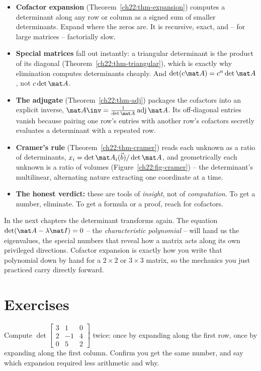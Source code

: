\begin{itemize}
\item \textbf{Cofactor expansion} (Theorem~\ref{ch22:thm-expansion}) computes a determinant along any
  row or column as a signed sum of smaller determinants. Expand where the zeros are. It is recursive,
  exact, and -- for large matrices -- factorially slow.
\item \textbf{Special matrices} fall out instantly: a triangular determinant is the product of its
  diagonal (Theorem~\ref{ch22:thm-triangular}), which is exactly why elimination computes determinants
  cheaply. And $\det(c\mat A)=c^n\det\mat A$, not $c\det\mat A$.
\item \textbf{The adjugate} (Theorem~\ref{ch22:thm-adj}) packages the cofactors into an explicit
  inverse, $\mat A\inv=\frac{1}{\det\mat A}\operatorname{adj}\mat A$. Its off-diagonal entries vanish
  because pairing one row's entries with another row's cofactors secretly evaluates a determinant with
  a repeated row.
\item \textbf{Cramer's rule} (Theorem~\ref{ch22:thm-cramer}) reads each unknown as a ratio of
  determinants, $x_i=\det\mat A_i(\vec b)/\det\mat A$, and geometrically each unknown is a ratio of
  volumes (Figure~\ref{ch22:fig-cramer}) -- the determinant's multilinear, alternating nature
  extracting one coordinate at a time.
\item \textbf{The honest verdict:} these are tools of \emph{insight}, not of \emph{computation}. To
  get a number, eliminate. To get a formula or a proof, reach for cofactors.
\end{itemize}

In the next chapters the determinant transforms again. The equation $\det(\mat A-\lambda\mat I)=0$ --
the \emph{characteristic polynomial} -- will hand us the eigenvalues, the special numbers that reveal
how a matrix acts along its own privileged directions. Cofactor expansion is exactly how you write
that polynomial down by hand for a $2\times2$ or $3\times3$ matrix, so the mechanics you just practiced
carry directly forward.

\section{Exercises}

\begin{exercise}\label{ch22:ex-warmup-expand}
Compute $\det\begin{bmatrix} 3 & 1 & 0 \\ 2 & -1 & 4 \\ 0 & 5 & 2\end{bmatrix}$ twice: once by
expanding along the first row, once by expanding along the first column. Confirm you get the same
number, and say which expansion required less arithmetic and why.
\end{exercise}

